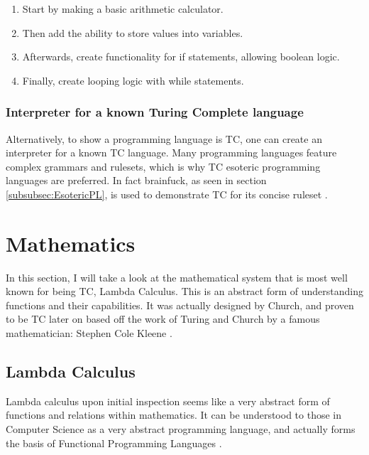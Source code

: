 \begin{enumerate}
    \item Start by making a basic arithmetic calculator.
    \item Then add the ability to store values into variables.
    \item Afterwards, create functionality for if statements, allowing boolean logic.
    \item Finally, create looping logic with while statements.
\end{enumerate}

\subsubsection{Interpreter for a known Turing Complete language}\label{subsec:InterpreterTC}

Alternatively, to show a programming language is TC, one can create an interpreter for a known TC language.
Many programming languages feature complex grammars and rulesets, which is why TC esoteric programming languages are preferred.
In fact brainfuck, as seen in section \ref{subsubsec:EsotericPL}, is used to demonstrate TC for its concise ruleset \cite{CBfInter,MeepWebsite,MeepGH,PythonBfInt}.

\section{Mathematics}\label{sec:Maths}

In this section, I will take a look at the mathematical system that is most well known for being TC, Lambda Calculus.
This is an abstract form of understanding functions and their capabilities.
It was actually designed by Church, and proven to be TC later on based off the work of Turing and Church by a famous mathematician: Stephen Cole Kleene \cite{LambdaCalcKleene}.

\subsection{Lambda Calculus}\label{subsec:LambdaCalc}

Lambda calculus upon initial inspection seems like a very abstract form of functions and relations within mathematics.
It can be understood to those in Computer Science as a very abstract programming language, and actually forms the basis of Functional Programming Languages \cite{TutLambdaCalc,FuncProgrChap}.


